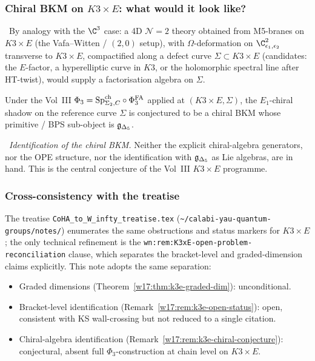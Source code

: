\subsubsection{Chiral BKM on $K3 \times E$: what would it look like?}
\label{w17:subsubsec:k3e-chiral}

\begin{remark}
\label{w17:rem:k3e-chiral-conjecture}
\ClaimStatusConjectured\ By analogy with the $\C^3$ case: a 4D $\mathcal{N} = 2$
theory obtained from M5-branes on $K3 \times E$ (the Vafa--Witten / $(2, 0)$
setup), with $\Omega$-deformation on $\C^2_{\eps_1, \eps_2}$ transverse to
$K3 \times E$, compactified along a defect curve $\Sigma \subset K3 \times E$
(candidates: the $E$-factor, a hyperelliptic curve in $K3$, or the holomorphic
spectral line after HT-twist), would supply a factorisation algebra on $\Sigma$.

Under the Vol~III $\Phi_3 = \mathrm{Sp}^{\mathrm{ch}}_{\Sigma_2, C} \circ \Phi^{\mathrm{FA}}_3$ applied at
$(K3 \times E, \Sigma)$, the $E_1$-chiral shadow on the reference curve $\Sigma$
is conjectured to be a chiral BKM whose primitive / BPS sub-object is $\mathfrak{g}_{\Delta_5}$.

\ClaimStatusOpen\ \emph{Identification of the chiral BKM.} Neither the explicit
chiral-algebra generators, nor the OPE structure, nor the identification with
$\mathfrak{g}_{\Delta_5}$ as Lie algebras, are in hand. This is the central conjecture of the
Vol~III $K3 \times E$ programme.
\end{remark}

\subsubsection{Cross-consistency with the treatise}
\label{w17:subsubsec:k3e-treatise-consistency}

The treatise \texttt{CoHA\_to\_W\_infty\_treatise.tex}
(\texttt{\textasciitilde /calabi-yau-quantum-groups/notes/}) enumerates the
same obstructions and status markers for $K3 \times E$; the only technical
refinement is the \texttt{wn:rem:K3xE-open-problem-reconciliation} clause,
which separates the bracket-level and graded-dimension claims explicitly. This
note adopts the same separation:
\begin{itemize}
\item Graded dimensions (Theorem~\ref{w17:thm:k3e-graded-dim}): unconditional.
\item Bracket-level identification
(Remark~\ref{w17:rem:k3e-open-status}): open, consistent with KS wall-crossing
but not reduced to a single citation.
\item Chiral-algebra identification
(Remark~\ref{w17:rem:k3e-chiral-conjecture}): conjectural, absent full
$\Phi_3$-construction at chain level on $K3 \times E$.
\end{itemize}

